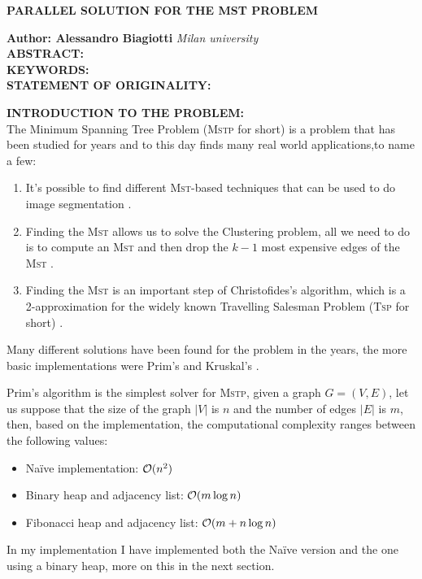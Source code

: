 \documentclass[a4paper,10pt]{article}
\begin{document}
\noindent
\begin{center}
	\textbf{{PARALLEL SOLUTION FOR THE MST PROBLEM}} \\
\end{center}

\noindent
\textbf{Author: Alessandro Biagiotti} \hfill \textit{Milan university}
\\


\noindent
\textbf{ABSTRACT:}
\\

\noindent
\textbf{KEYWORDS:}
\\

\noindent
\textbf{STATEMENT OF ORIGINALITY:}

\noindent
{}
\makeatletter\def\@currentlabel{\texttt{(I)}}\makeatother
\label{sec:intro}
\textbf{INTRODUCTION TO THE PROBLEM:}
\\
The Minimum Spanning Tree Problem (\textsc{Mstp} for short) is a problem that has been studied for years and to this day finds many real world applications,to name a few:
\begin{enumerate}
	\item It's possible to find different \textsc{Mst}-based techniques that can be used to do image segmentation \cite{maze-generation} \cite{mst-segmentation-heuristic}.
	\item Finding the \textsc{Mst} allows us to solve the Clustering problem, all we need to do is to compute an \textsc{Mst} and then drop the $k - 1$ most expensive edges of the \textsc{Mst} \cite{mst-applications}.
	\item Finding the \textsc{Mst} is an important step of Christofides's algorithm, which is a 2-approximation for the widely known Travelling Salesman Problem (\textsc{Tsp} for short) \cite{tsp-christofides}.
\end{enumerate}

Many different solutions have been found for the problem in the years, the more basic implementations were Prim's \cite{prim-algorithm} and Kruskal's \cite{kruskal-algorithm}.

Prim's algorithm is the simplest solver for \textsc{Mstp}, given a graph $G= (V, E)$, let us suppose that the size of the graph $|V|$ is $n$ and the number of edges $|E|$ is $m$, then, based on the implementation, the computational complexity ranges between the following values:
\begin{itemize}
	\item Naïve implementation: $\mathcal{O}(n^2)$
	\item Binary heap and adjacency list: $\mathcal{O}(m\log{n})$
	\item Fibonacci heap and adjacency list: $\mathcal{O}(m + n\log{n})$
\end{itemize}
In my implementation I have implemented both the Naïve version and the one using a binary heap, more on this in the next section.
\end{document}
